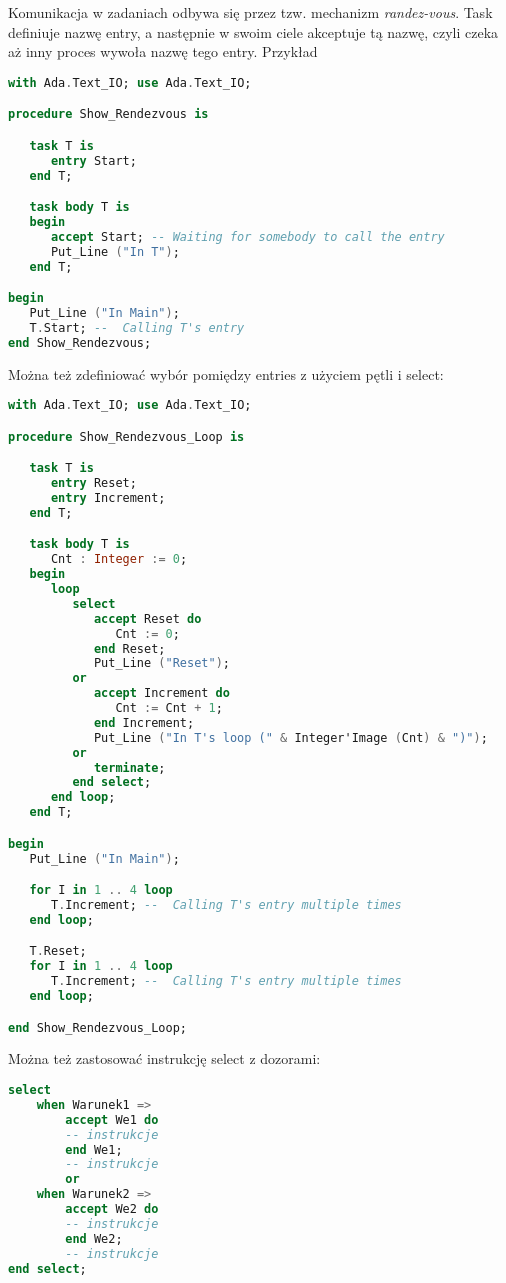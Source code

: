 \documentclass[a4paper,15pt]{article}
\begin{document}
Komunikacja w zadaniach odbywa się przez tzw. mechanizm \textit{randez-vous}. Task definiuje nazwę entry, a następnie w swoim ciele akceptuje tą nazwę, czyli czeka aż inny proces wywoła nazwę tego entry. Przykład

\begin{lstlisting}[language=Ada]
with Ada.Text_IO; use Ada.Text_IO;

procedure Show_Rendezvous is

   task T is
      entry Start;
   end T;

   task body T is
   begin
      accept Start; -- Waiting for somebody to call the entry
      Put_Line ("In T");
   end T;

begin
   Put_Line ("In Main");
   T.Start; --  Calling T's entry
end Show_Rendezvous;
\end{lstlisting}

Można też zdefiniować wybór pomiędzy entries z użyciem pętli i select:
\begin{lstlisting}[language=Ada]
with Ada.Text_IO; use Ada.Text_IO;

procedure Show_Rendezvous_Loop is

   task T is
      entry Reset;
      entry Increment;
   end T;

   task body T is
      Cnt : Integer := 0;
   begin
      loop
         select
            accept Reset do
               Cnt := 0;
            end Reset;
            Put_Line ("Reset");
         or
            accept Increment do
               Cnt := Cnt + 1;
            end Increment;
            Put_Line ("In T's loop (" & Integer'Image (Cnt) & ")");
         or
            terminate;
         end select;
      end loop;
   end T;

begin
   Put_Line ("In Main");

   for I in 1 .. 4 loop
      T.Increment; --  Calling T's entry multiple times
   end loop;

   T.Reset;
   for I in 1 .. 4 loop
      T.Increment; --  Calling T's entry multiple times
   end loop;

end Show_Rendezvous_Loop;
\end{lstlisting}

Można też zastosować instrukcję select z dozorami:
\begin{lstlisting}[language=Ada]
select
	when Warunek1 =>
		accept We1 do
		-- instrukcje
		end We1;
		-- instrukcje
		or
	when Warunek2 =>
		accept We2 do
		-- instrukcje
		end We2;
		-- instrukcje
end select;
\end{lstlisting}
\end{document}
